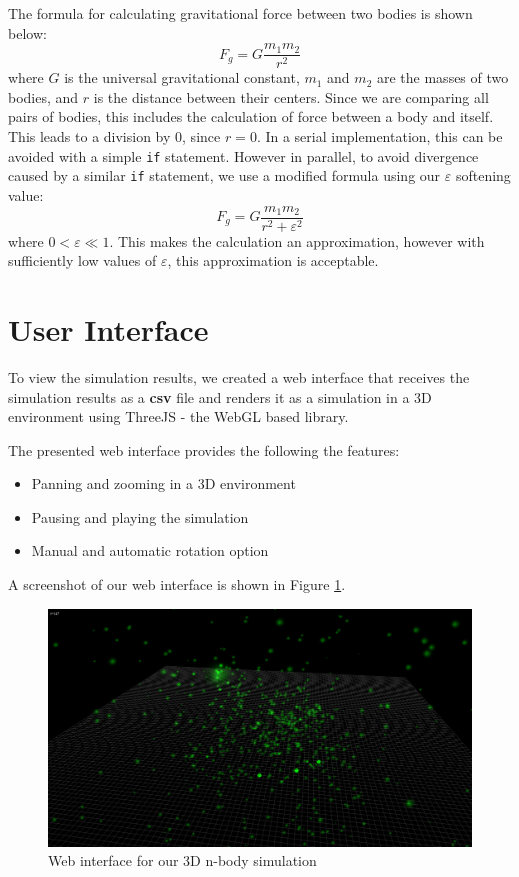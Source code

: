 \documentclass[11pt,a4paper]{article}
\begin{document}
	The formula for calculating gravitational force between two bodies is shown below:
	\begin{equation}
	F_g = G\frac{m_1 m_2}{r^2}
	\end{equation}
	where $G$ is the universal gravitational constant, $m_1$ and $m_2$ are the masses of two bodies, and $r$ is the distance between their centers. Since we are comparing all pairs of bodies, this includes the calculation of force between a body and itself. This leads to a division by 0, since $r = 0$. In a serial implementation, this can be avoided with a simple \texttt{if} statement. However in parallel, to avoid divergence caused by a similar \texttt{if} statement, we use a modified formula using our $\varepsilon$ softening value:
	\begin{equation}
	F_g = G\frac{m_1 m_2}{r^2 + \varepsilon^2}
	\end{equation}
	where $0 < \varepsilon \ll 1$. This makes the calculation an approximation, however with sufficiently low values of $\varepsilon$, this approximation is acceptable.
	
	\section{User Interface}
	To view the simulation results, we created a web interface that receives the simulation results as a \textbf{csv} file and renders it as a simulation in a 3D environment using ThreeJS - the WebGL based library.
	
	The presented web interface provides the following the features: 
	\begin{itemize}
		\item Panning and zooming in a 3D environment
		\item Pausing and playing the simulation 
		\item Manual and automatic rotation option
	\end{itemize}
	
	A screenshot of our web interface is shown in Figure \ref{scr}.
	\begin{figure}
		\centering
		\includegraphics[scale=0.3]{scr.png}
		\caption{Web interface for our 3D n-body simulation}
		\label{scr}
	\end{figure}
	
\end{document}
